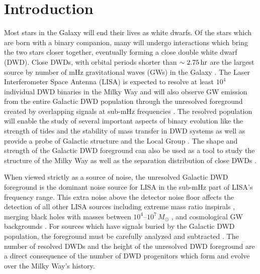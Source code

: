 \documentclass[twocolumn]{aastex631}
\begin{document}
\section{Introduction} \label{sec:intro}
Most stars in the Galaxy will end their lives as white dwarfs. Of the stars which are born with a binary companion, many will undergo interactions which bring the two stars closer together, eventually forming a close double white dwarf (DWD). Close DWDs, with orbital periods shorter than $\sim2.75\,\rm{hr}$ %
are the largest source by number of mHz gravitational waves (GWs) in the Galaxy \citep[e.g.,][]{LISAMissionProposal}. The Laser Interferometer Space Antenna (LISA) is expected to resolve at least $10^4$ individual DWD binaries in the Milky Way and will also observe GW emission from the entire Galactic DWD population through the unresolved foreground created by overlapping signals at sub-mHz frequencies \citep[e.g.,][]{Nelemans2001a, Ruiter2010, Nissanke2012, Yu2013, Korol2017, Lamberts2019, Breivik2020a}. The resolved population will enable the study of several important aspects of binary evolution like the strength of tides \citep{Valsecchi2012} and the stability of mass transfer in DWD systems \citep[e.g.,][]{Marsh2004, Shen2015, Gokhale2007, Sepinsky2014, Kremer2015} as well as provide a probe of Galactic structure \citep{Korol2019} and the Local Group \citep{Korol2018}. The shape and strength of the Galactic DWD foreground can also be used as a tool to study the structure of the Milky Way \citep{Benacquista2006, Breivik2020b} as well as the separation distribution of close DWDs \citep{Korol2021}.

When viewed strictly as a source of noise, the unresolved Galactic DWD foreground is the dominant noise source for LISA in the sub-mHz part of LISA's frequency range. This extra noise above the detector noise floor affects the detection of all other LISA sources including extreme mass ratio inspirals \citep[e.g.,][]{Berti2006, Barack2007, Babak2017, Moore2017}, merging black holes with masses between $10^4$--$10^7\,M_{\odot}$ \citep[e.g.,][]{Klein2016, Bellovary2019}, and cosmological GW backgrounds \citep[e.g.,][]{Bartolo2016, Caprini2016, Caldwell2019}. For sources which have signals buried by the Galactic DWD population, the foreground must be carefully analyzed and subtracted \citep[][]{Adams2014,Cornish2020,Littenberg2020,Boileau2021}. The number of resolved DWDs and the height of the unresolved DWD foreground are a direct consequence of the number of DWD progenitors which form and evolve over the Milky Way's history. 
\end{document}
